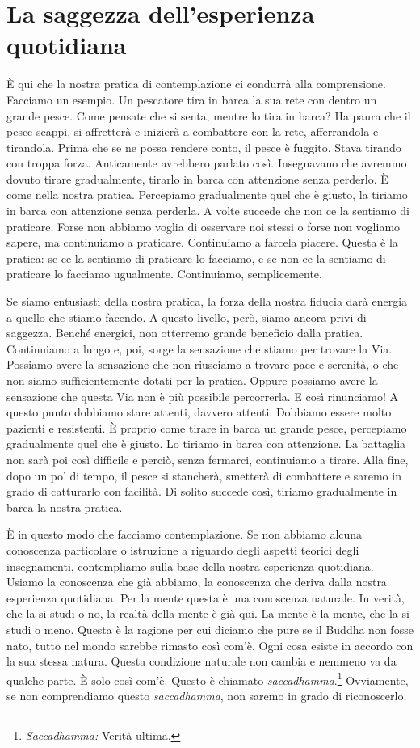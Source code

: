 \section{La saggezza dell'esperienza quotidiana}

È qui che la nostra pratica di contemplazione ci condurrà alla
comprensione. Facciamo un esempio. Un pescatore tira in barca la sua
rete con dentro un grande pesce. Come pensate che si senta, mentre lo
tira in barca? Ha paura che il pesce scappi, si affretterà e inizierà a
combattere con la rete, afferrandola e tirandola. Prima che se ne possa
rendere conto, il pesce è fuggito. Stava tirando con troppa forza.
Anticamente avrebbero parlato così. Insegnavano che avremmo dovuto
tirare gradualmente, tirarlo in barca con attenzione senza perderlo. È
come nella nostra pratica. Percepiamo gradualmente quel che è giusto, la
tiriamo in barca con attenzione senza perderla. A volte succede che non
ce la sentiamo di praticare. Forse non abbiamo voglia di osservare noi
stessi o forse non vogliamo sapere, ma continuiamo a praticare.
Continuiamo a farcela piacere. Questa è la pratica: se ce la sentiamo di
praticare lo facciamo, e se non ce la sentiamo di praticare lo facciamo
ugualmente. Continuiamo, semplicemente.

Se siamo entusiasti della nostra pratica, la forza della nostra fiducia
darà energia a quello che stiamo facendo. A questo livello, però, siamo
ancora privi di saggezza. Benché energici, non otterremo grande
beneficio dalla pratica. Continuiamo a lungo e, poi, sorge la sensazione
che stiamo per trovare la Via. Possiamo avere la sensazione che non
riusciamo a trovare pace e serenità, o che non siamo sufficientemente
dotati per la pratica. Oppure possiamo avere la sensazione che questa
Via non è più possibile percorrerla. E così rinunciamo! A questo punto
dobbiamo stare attenti, davvero attenti. Dobbiamo essere molto pazienti
e resistenti. È proprio come tirare in barca un grande pesce, percepiamo
gradualmente quel che è giusto. Lo tiriamo in barca con attenzione. La
battaglia non sarà poi così difficile e perciò, senza fermarci,
continuiamo a tirare. Alla fine, dopo un po' di tempo, il pesce si
stancherà, smetterà di combattere e saremo in grado di catturarlo con
facilità. Di solito succede così, tiriamo gradualmente in barca la
nostra pratica.

È in questo modo che facciamo contemplazione. Se non abbiamo alcuna
conoscenza particolare o istruzione a riguardo degli aspetti teorici
degli insegnamenti, contempliamo sulla base della nostra esperienza
quotidiana. Usiamo la conoscenza che già abbiamo, la conoscenza che
deriva dalla nostra esperienza quotidiana. Per la mente questa è una
conoscenza naturale. In verità, che la si studi o no, la realtà della
mente è già qui. La mente è la mente, che la si studi o meno. Questa è
la ragione per cui diciamo che pure se il Buddha non fosse nato, tutto
nel mondo sarebbe rimasto così com'è. Ogni cosa esiste in accordo con la
sua stessa natura. Questa condizione naturale non cambia e nemmeno va da
qualche parte. È solo così com'è. Questo è chiamato
\emph{saccadhamma}.\footnote{\emph{Saccadhamma:} Verità ultima.}
Ovviamente, se non comprendiamo questo \emph{saccadhamma}, non saremo in
grado di riconoscerlo.

